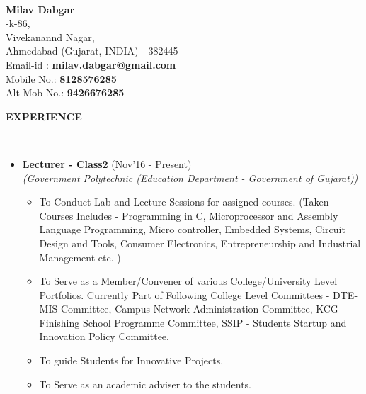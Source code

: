 \documentclass[a4paper,10pt]{article}
\newcommand{\isep}{-2 pt}
\newcommand{\lsep}{-0.5cm}
\newcommand{\resheading}[1]{{\small \colorbox{mygrey}{\begin{minipage}{0.975\textwidth}{\textbf{#1 \vphantom{p\^{E}}}}\end{minipage}}}}
\begin{document}
\hspace{0.5cm}\\[-0.2cm]

\textbf{Milav Dabgar} \\
-k-86, \\
\indent Vivekanannd Nagar,  \\
\indent Ahmedabad (Gujarat, INDIA) - 382445\\
\indent Email-id : \textbf{milav.dabgar@gmail.com} \\
\indent Mobile No.: \textbf{8128576285} \\
\indent Alt Mob No.: \textbf{9426676285} \\

\resheading{\textbf{EXPERIENCE} }\\[\lsep]
\begin{itemize}
\item \textbf{Lecturer - Class2} (Nov'16 - Present) \\
 \emph{(Government Polytechnic (Education Department - Government of Gujarat))} \\[-0.6cm]
	\begin{itemize}\itemsep \isep
	\item To Conduct Lab and Lecture Sessions for assigned courses. (Taken Courses Includes - Programming in C, Microprocessor and Assembly Language Programming, Micro controller, Embedded Systems, Circuit Design and Tools, Consumer Electronics, Entrepreneurship and Industrial Management etc. )
	\item To Serve as a Member/Convener of various College/University Level Portfolios. Currently Part of Following College Level Committees - DTE-MIS Committee, Campus Network Administration Committee, KCG Finishing School Programme Committee, SSIP - Students Startup and Innovation Policy Committee.
	\item To guide Students for Innovative Projects.
	\item To Serve as an academic adviser to the students.
\end{itemize}


\end{itemize}
\end{document}
